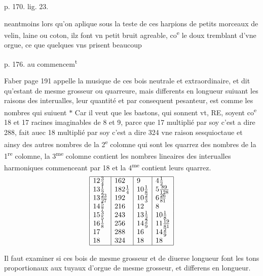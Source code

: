 \documentclass[11pt,a4paper]{article}
\begin{document}
p. 170. lig. 23.

neantmoins lors qu'on aplique sous la teste de ces harpions de petits morceaux de velin, laine ou coton, ilz font vn petit bruit agreable, co\textsuperscript{e} le doux tremblant d'vne orgue, ce que quelques vns prisent beaucoup

p. 176. au commencem\textsuperscript{t}

Faber page 191 appelle la musique de ces bois neutrale et extraordinaire, et dit qu'estant de mesme grosseur ou quarreure, mais differents en longueur suiuant les raisons des interualles, leur quantité et par consequent pesanteur, est comme les nombres qui suiuent $*$ Car il veut que les bastons, qui sonnent vt, RE, soyent co\textsuperscript{e} 18 et 17 racines imaginables de 8 et 9, parce que 17 multiplié par soy c'est a dire 288, fait auec 18 multiplié par soy c'est a dire 324 vne raison sesquioctaue et ainsy des autres nombres de la 2\textsuperscript{e} colomne qui sont  les quarrez des nombres de la 1\textsuperscript{re} colomne, la 3\textsuperscript{me} colomne contient les nombres lineaires des interualles harmoniques commenceant par 18 et la 4\textsuperscript{me} contient leurs quarrez.
\[
\begin{array}{|l|l|l|l|}
\hline
12\frac{3}{4} & 162 & 9 & 4\frac{1}{2} \\
13\frac{1}{2} & 182\frac{1}{4} & 10\frac{1}{8} & 5\frac{89}{128} \\
13\frac{23}{27} & 192 & 10\frac{2}{3} & 6\frac{26}{81} \\
14\frac{5}{7} & 216 & 12 & 8 \\
15\frac{3}{5} & 243 & 13\frac{1}{2} & 10\frac{1}{8} \\
16\frac{1}{8} & 256 & 14\frac{2}{9} & 11\frac{19}{81} \\
17 & 288 & 16 & 14\frac{2}{9} \\
18 & 324 & 18 & 18 \\ \hline
\end{array}
\]

Il faut examiner si ces bois de mesme grosseur et de diuerse longueur font les tons proportionaux aux tuyaux d'orgue de mesme grosseur, et differens en longueur.

\end{document}
